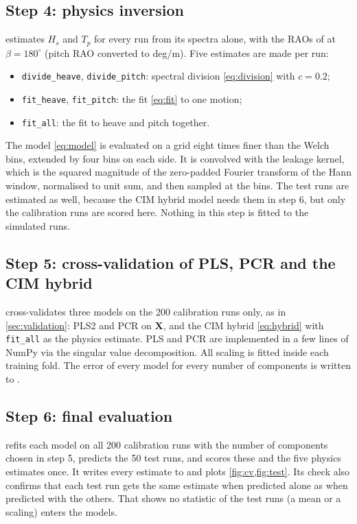 \documentclass[11pt,a4paper]{article}
\newcommand{\Hs}{H_{s}}
\newcommand{\Tp}{T_{p}}
\newcommand{\vect}[1]{\boldsymbol{#1}}
\begin{document}
\subsection{Step 4: physics inversion}
\label{sec:step4}

 estimates $\Hs$ and $\Tp$ for every run from its spectra alone, with
the RAOs of  at $\beta = 180^\circ$ (pitch RAO converted to
deg/m). Five estimates are made per run:
\begin{itemize}
  \item \texttt{divide\_heave}, \texttt{divide\_pitch}: spectral division
        \cref{eq:division} with $c = 0.2$;
  \item \texttt{fit\_heave}, \texttt{fit\_pitch}: the fit \cref{eq:fit} to one motion;
  \item \texttt{fit\_all}: the fit to heave and pitch together.
\end{itemize}
The model \cref{eq:model} is evaluated on a grid eight times finer than the Welch bins, extended
by four bins on each side. It is convolved with the leakage kernel, which is the squared
magnitude of the zero-padded Fourier transform of the Hann window, normalised to unit sum, and
then sampled at the bins. The test runs are estimated as well, because the CIM hybrid model needs
them in step 6, but only the calibration runs are scored here. Nothing in this step is fitted to
the simulated runs.

\subsection{Step 5: cross-validation of PLS, PCR and the CIM hybrid}
\label{sec:step5}

 cross-validates three models on the 200 calibration runs only, as in
\cref{sec:validation}: PLS2 and PCR on $\vect X$, and the CIM hybrid \cref{eq:hybrid} with
\texttt{fit\_all} as the physics estimate. PLS and PCR are implemented in a few lines of NumPy
via the singular value decomposition. All scaling is fitted inside each training fold.
The error of every model for every number of components is written to .

\subsection{Step 6: final evaluation}
\label{sec:step6}

 refits each model on all 200 calibration runs with the number of components
chosen in step 5, predicts the 50 test runs, and scores these and the five physics estimates
once. It writes every estimate to  and plots \cref{fig:cv,fig:test}. Its
check also confirms that each test run gets the same estimate when predicted alone as when
predicted with the others. That shows no statistic of the test runs (a mean or a scaling)
enters the models.
\end{document}

